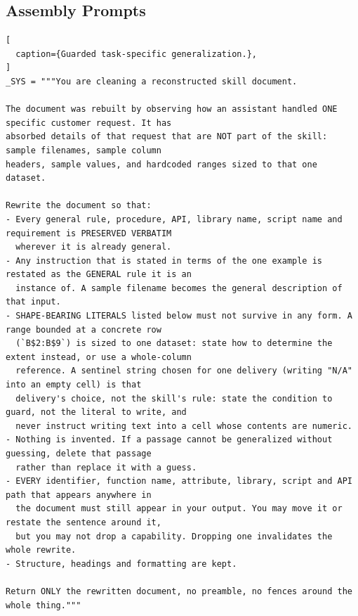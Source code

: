 \newpage
\subsection{Assembly Prompts}

\begin{lstlisting}[
  caption={Guarded task-specific generalization.},
]
_SYS = """You are cleaning a reconstructed skill document.

The document was rebuilt by observing how an assistant handled ONE specific customer request. It has
absorbed details of that request that are NOT part of the skill: sample filenames, sample column
headers, sample values, and hardcoded ranges sized to that one dataset.

Rewrite the document so that:
- Every general rule, procedure, API, library name, script name and requirement is PRESERVED VERBATIM
  wherever it is already general.
- Any instruction that is stated in terms of the one example is restated as the GENERAL rule it is an
  instance of. A sample filename becomes the general description of that input.
- SHAPE-BEARING LITERALS listed below must not survive in any form. A range bounded at a concrete row
  (`B$2:B$9`) is sized to one dataset: state how to determine the extent instead, or use a whole-column
  reference. A sentinel string chosen for one delivery (writing "N/A" into an empty cell) is that
  delivery's choice, not the skill's rule: state the condition to guard, not the literal to write, and
  never instruct writing text into a cell whose contents are numeric.
- Nothing is invented. If a passage cannot be generalized without guessing, delete that passage
  rather than replace it with a guess.
- EVERY identifier, function name, attribute, library, script and API path that appears anywhere in
  the document must still appear in your output. You may move it or restate the sentence around it,
  but you may not drop a capability. Dropping one invalidates the whole rewrite.
- Structure, headings and formatting are kept.

Return ONLY the rewritten document, no preamble, no fences around the whole thing."""
\end{lstlisting}

